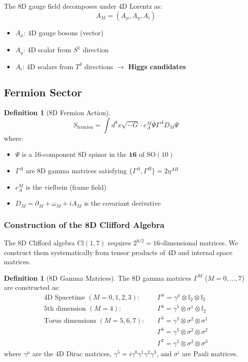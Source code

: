 \documentclass[11pt,a4paper]{article}
\theoremstyle{plain}
\theoremstyle{definition}
\newtheorem{definition}[theorem]{Definition}
\theoremstyle{remark}
\newcommand{\Tthree}{T^3}
\newcommand{\SOten}{\text{SO}(10)}
\begin{document}
The 8D gauge field decomposes under 4D Lorentz as:
\begin{equation}
A_M = (A_\mu, A_y, A_i)
\end{equation}
\begin{itemize}
  \item $A_\mu$: 4D gauge bosons (vector)
  \item $A_y$: 4D scalar from $S^1$ direction
  \item $A_i$: 4D scalars from $\Tthree$ directions $\rightarrow$ \textbf{Higgs candidates}
\end{itemize}

\subsection{Fermion Sector}

\begin{definition}[8D Fermion Action]
\begin{equation}
S_{\text{fermion}} = \int d^8x \sqrt{-G} \cdot e_A^M \bar{\Psi} \Gamma^A D_M \Psi
\end{equation}
where:
\begin{itemize}
  \item $\Psi$ is a 16-component 8D spinor in the $\mathbf{16}$ of $\SOten$
  \item $\Gamma^A$ are 8D gamma matrices satisfying $\{\Gamma^A, \Gamma^B\} = 2\eta^{AB}$
  \item $e_A^M$ is the vielbein (frame field)
  \item $D_M = \partial_M + \omega_M + iA_M$ is the covariant derivative
\end{itemize}
\end{definition}

\subsubsection{Construction of the 8D Clifford Algebra}

The 8D Clifford algebra $\text{Cl}(1,7)$ requires $2^{8/2} = 16$-dimensional matrices. We construct them systematically from tensor products of 4D and internal space matrices.

\begin{definition}[8D Gamma Matrices]
The 8D gamma matrices $\Gamma^M$ ($M = 0,\ldots,7$) are constructed as:
\begin{align}
\text{4D Spacetime } (M = 0,1,2,3): \quad & \Gamma^\mu = \gamma^\mu \otimes \mathbb{I}_2 \otimes \mathbb{I}_2 \\
\text{5th dimension } (M = 4): \quad & \Gamma^4 = \gamma^5 \otimes \sigma^1 \otimes \mathbb{I}_2 \\
\text{Torus dimensions } (M = 5,6,7): \quad & \Gamma^5 = \gamma^5 \otimes \sigma^2 \otimes \sigma^1 \\
& \Gamma^6 = \gamma^5 \otimes \sigma^2 \otimes \sigma^2 \\
& \Gamma^7 = \gamma^5 \otimes \sigma^2 \otimes \sigma^3
\end{align}
where $\gamma^\mu$ are the 4D Dirac matrices, $\gamma^5 = i\gamma^0\gamma^1\gamma^2\gamma^3$, and $\sigma^i$ are Pauli matrices.
\end{definition}
\end{document}

